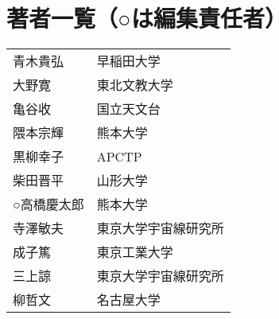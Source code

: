 \newpage
\section*{著者一覧（○は編集責任者）}
\begin{tabular}{ll}
\noalign{\smallskip}
青木貴弘 & 早稲田大学 \\
大野寛 & 東北文教大学 \\
亀谷收 & 国立天文台 \\
隈本宗輝 & 熊本大学 \\
黒柳幸子 & APCTP \\
柴田晋平 & 山形大学 \\
○高橋慶太郎 & 熊本大学 \\
寺澤敏夫 & 東京大学宇宙線研究所 \\
成子篤 & 東京工業大学 \\
三上諒 & 東京大学宇宙線研究所 \\
柳哲文 & 名古屋大学
\end{tabular}

